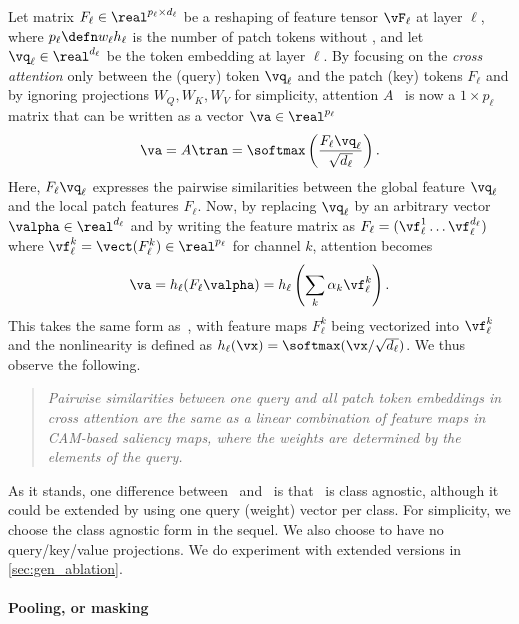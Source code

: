 Let matrix $F_\ell \in \real^{p_\ell \times d_\ell}$ be a reshaping of feature tensor $\vF_\ell$ at layer $\ell$, where $p_\ell \defn w_\ell h_\ell$ is the number of patch tokens without \cls, and let $\vq_\ell \in \real^{d_\ell}$ be the \cls token embedding at layer $\ell$. By focusing on the \emph{cross attention} only between the \cls (query) token $\vq_\ell$ and the patch (key) tokens $F_\ell$ and by ignoring projections $W_Q, W_K, W_V$ for simplicity, attention $A$~ is now a $1 \times p_\ell$ matrix that can be written as a vector $\va \in \real^{p_\ell}$
\begin{equation}
	\va = A\tran = \softmax \left( \frac{F_\ell \vq_\ell}{\sqrt{d_\ell}} \right).
\label{eq:cross-attention}
\end{equation}
Here, $F_\ell \vq_\ell$ expresses the pairwise similarities between the global \cls feature $\vq_\ell$ and the local patch features $F_\ell$. Now, by replacing $\vq_\ell$ by an arbitrary vector $\valpha \in \real^{d_\ell}$ and by writing the feature matrix as
$F_\ell = (\vf_\ell^1 \dots \vf_\ell^{d_\ell})$ where $\vf_\ell^k = \vect(F_\ell^k) \in \real^{p_\ell}$ for channel $k$, attention  becomes
\begin{equation}
	\va = h_\ell (F_\ell \valpha) =
		h_\ell \left( \sum_k \alpha_k \vf_\ell^k \right).
\label{eq:connection}
\end{equation}
This takes the same form as~, with feature maps $F_\ell^k$ being vectorized into $\vf_\ell^k$ and the nonlinearity is defined as $h_\ell(\vx) = \softmax(\vx / \sqrt{d_\ell})$. We thus observe the following.

\begin{quote}
	\emph{Pairwise similarities between one query and all patch token embeddings in cross attention are the same as a linear combination of feature maps in CAM-based saliency maps, where the weights are determined by the elements of the query.}
\end{quote}

As it stands, one difference between~ and~ is that~ is class agnostic, although it could be extended by using one query (weight) vector per class. For simplicity, we choose the class agnostic form  in the sequel. We also choose to have no query/key/value projections. We do experiment with extended versions in \autoref{sec:gen_ablation}.

\paragraph{Pooling, or masking}

